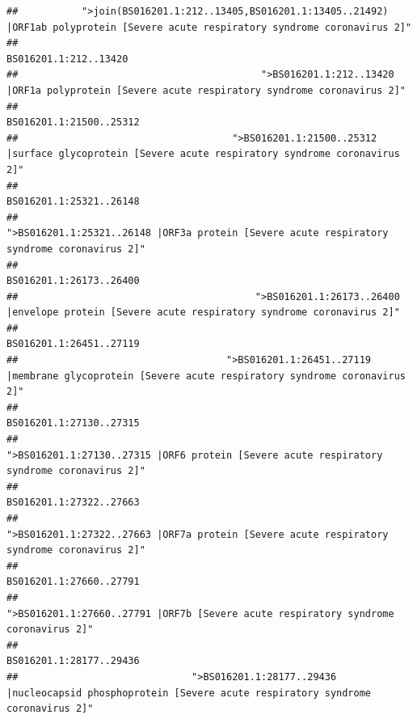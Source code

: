 \documentclass[
]{article}
\begin{document}
\begin{verbatim}
##           ">join(BS016201.1:212..13405,BS016201.1:13405..21492) |ORF1ab polyprotein [Severe acute respiratory syndrome coronavirus 2]" 
##                                                                                                                  BS016201.1:212..13420 
##                                          ">BS016201.1:212..13420 |ORF1a polyprotein [Severe acute respiratory syndrome coronavirus 2]" 
##                                                                                                                BS016201.1:21500..25312 
##                                     ">BS016201.1:21500..25312 |surface glycoprotein [Severe acute respiratory syndrome coronavirus 2]" 
##                                                                                                                BS016201.1:25321..26148 
##                                            ">BS016201.1:25321..26148 |ORF3a protein [Severe acute respiratory syndrome coronavirus 2]" 
##                                                                                                                BS016201.1:26173..26400 
##                                         ">BS016201.1:26173..26400 |envelope protein [Severe acute respiratory syndrome coronavirus 2]" 
##                                                                                                                BS016201.1:26451..27119 
##                                    ">BS016201.1:26451..27119 |membrane glycoprotein [Severe acute respiratory syndrome coronavirus 2]" 
##                                                                                                                BS016201.1:27130..27315 
##                                             ">BS016201.1:27130..27315 |ORF6 protein [Severe acute respiratory syndrome coronavirus 2]" 
##                                                                                                                BS016201.1:27322..27663 
##                                            ">BS016201.1:27322..27663 |ORF7a protein [Severe acute respiratory syndrome coronavirus 2]" 
##                                                                                                                BS016201.1:27660..27791 
##                                                    ">BS016201.1:27660..27791 |ORF7b [Severe acute respiratory syndrome coronavirus 2]" 
##                                                                                                                BS016201.1:28177..29436 
##                              ">BS016201.1:28177..29436 |nucleocapsid phosphoprotein [Severe acute respiratory syndrome coronavirus 2]" 

\end{verbatim}
\end{document}
